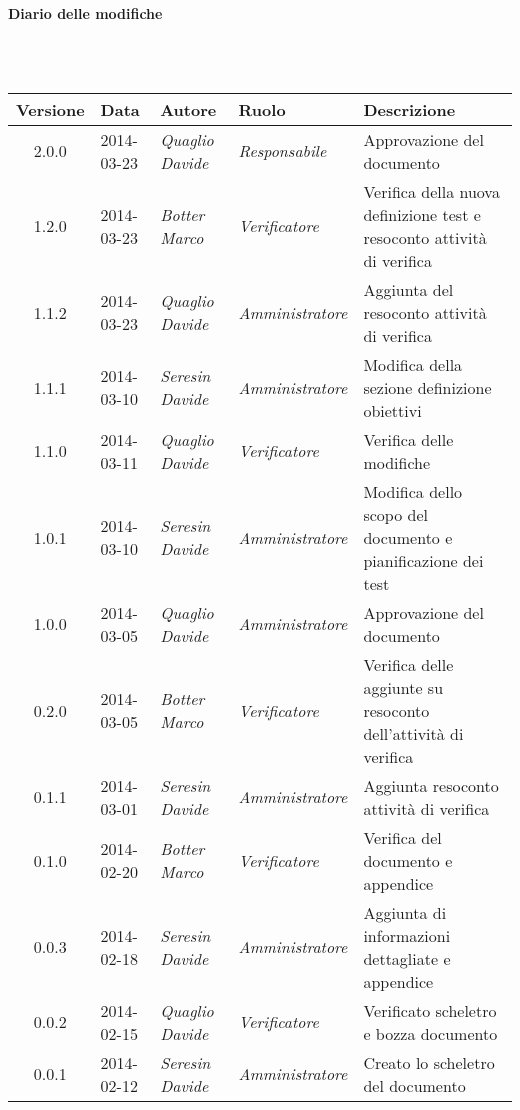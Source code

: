 \noindent\begin{Large}\textbf{Diario delle modifiche}\end{Large}\\
\\
\begin{small}
\begin{tabular}{|c|p{1.8cm}|p{2.8cm}|p{2.8cm}|p{3.5cm}|}
\hline
Versione & Data & Autore & Ruolo & Descrizione \\
\hline
\hline
2.0.0 & 2014-03-23 & 
\textit{Quaglio Davide} &
\textit{Responsabile} &  Approvazione del documento\\
\hline
1.2.0 & 2014-03-23 & 
\textit{Botter Marco} &
\textit{Verificatore} &  Verifica della nuova definizione test e resoconto attività di verifica\\
\hline
1.1.2 & 2014-03-23 & 
\textit{Quaglio Davide} &
\textit{Amministratore} &  Aggiunta del resoconto attività di verifica\\
\hline
1.1.1 & 2014-03-10 & 
\textit{Seresin Davide} &
\textit{Amministratore} &  Modifica della sezione definizione obiettivi\\
\hline
1.1.0 & 2014-03-11 & 
\textit{Quaglio Davide} &
\textit{Verificatore} &  Verifica delle modifiche\\
\hline
1.0.1 & 2014-03-10 & 
\textit{Seresin Davide} &
\textit{Amministratore} &  Modifica dello scopo del documento e pianificazione dei test\\
\hline
1.0.0 & 2014-03-05 & 
\textit{Quaglio Davide} &
\textit{Amministratore} &  Approvazione del documento\\
\hline
0.2.0 & 2014-03-05 & 
\textit{Botter Marco} &
\textit{Verificatore} &  Verifica delle aggiunte su resoconto dell'attività di verifica\\
\hline
0.1.1 & 2014-03-01 & 
\textit{Seresin Davide} &
\textit{Amministratore} &  Aggiunta resoconto attività di verifica\\
\hline
0.1.0 & 2014-02-20 & 
\textit{Botter Marco} &
\textit{Verificatore} &  Verifica del documento e appendice\\
\hline
0.0.3 & 2014-02-18 & 
\textit{Seresin Davide} &
\textit{Amministratore} &  Aggiunta di informazioni dettagliate e appendice\\
\hline
0.0.2 & 2014-02-15 & 
\textit{Quaglio Davide} &
\textit{Verificatore} &  Verificato scheletro e bozza documento\\
\hline
0.0.1 & 2014-02-12 & 
\textit{Seresin Davide} &
\textit{Amministratore} &  Creato lo scheletro del documento\\
\hline
\end{tabular}\\
\end{small}